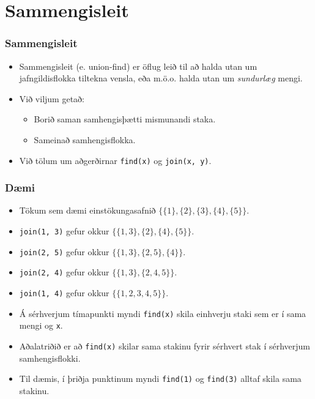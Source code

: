 \documentclass{beamer}
\begin{document}
\section[Sammengisleit]{Sammengisleit}

\begin{frame}
\frametitle{Sammengisleit}
\begin{itemize}

\item<1-> Sammengisleit (e. union-find) er öflug leið til að halda utan um jafngildisflokka tiltekna vensla,
	eða m.ö.o. halda utan um \emph{sundurlæg} mengi.
\item<2-> Við viljum getað:
	\begin{itemize}
		\item<3-> Borið saman samhengisþætti mismunandi staka.
		\item<4-> Sameinað samhengisflokka.
	\end{itemize}
\item<5-> Við tölum um aðgerðirnar \texttt{find(x)} og \texttt{join(x, y)}.

\end{itemize}
\end{frame}

\begin{frame}
\frametitle{Dæmi}
\begin{itemize}

	\item<1-> Tökum sem dæmi einstökungasafnið
		$\{\{1\}, \{2\}, \{3\}, \{4\}, \{5\}\}$. 
	\item<2-> \texttt{join(1, 3)} gefur okkur
		$\{\{1, 3\}, \{2\}, \{4\}, \{5\}\}$. 
	\item<3-> \texttt{join(2, 5)} gefur okkur
		$\{\{1, 3\}, \{2, 5\}, \{4\}\}$. 
	\item<4-> \texttt{join(2, 4)} gefur okkur
		$\{\{1, 3\}, \{2, 4, 5\}\}$. 
	\item<5-> \texttt{join(1, 4)} gefur okkur
		$\{\{1, 2, 3, 4, 5\}\}$. 
	\item<6-> Á sérhverjum tímapunkti myndi \texttt{find(x)} skila einhverju staki sem er í sama mengi og \texttt{x}.
	\item<7-> Aðalatriðið er að \texttt{find(x)} skilar sama stakinu fyrir sérhvert stak í sérhverjum samhengisflokki.
	\item<8-> Til dæmis, í þriðja punktinum myndi \texttt{find(1)} og \texttt{find(3)} alltaf skila sama stakinu.
\end{itemize}
\end{frame}
\end{document}
